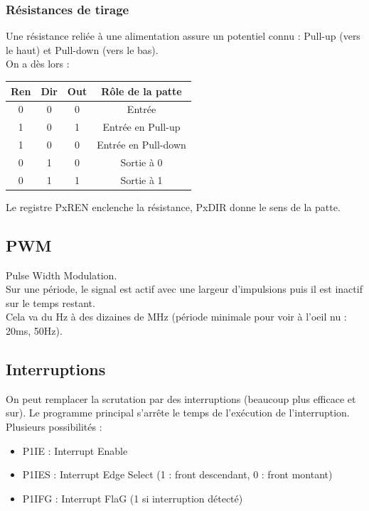 \documentclass[../main.tex]{subfiles}
\begin{document}
\subsubsection{Résistances de tirage}
Une résistance reliée à une alimentation assure un potentiel connu : Pull-up (vers le haut) et Pull-down (vers le bas).\\

On a dès lors : \begin{table}[hbt!]
    \centering
    \begin{tabular}{|c|c|c|c|}
    \hline
        Ren & Dir & Out & Rôle de la patte \\ \hline
        0 & 0 & 0 & Entrée\\ \hline
        1 & 0 & 1 & Entrée en Pull-up\\ \hline
        1 & 0 & 0 & Entrée en Pull-down\\ \hline
        0 & 1 & 0 & Sortie à 0\\ \hline
        0 & 1 & 1 & Sortie à 1\\ \hline
    \end{tabular}
\end{table}

Le registre PxREN enclenche la résistance, PxDIR donne le sens de la patte.\\

\subsection{PWM}
Pulse Width Modulation.\\
Sur une période, le signal est actif avec une largeur d'impulsions puis il est inactif sur le temps restant.\\

Cela va du Hz à des dizaines de MHz (période minimale pour voir à l'oeil nu : 20ms, 50Hz).\\

\subsection{Interruptions}
On peut remplacer la scrutation par des interruptions (beaucoup plus efficace et sur). Le programme principal s'arrête le temps de l'exécution de l'interruption. \\
Plusieurs possibilités : \begin{itemize}
    \item P1IE : Interrupt Enable\\
    \item P1IES : Interrupt Edge Select (1 : front descendant, 0 : front montant)\\
    \item P1IFG : Interrupt FlaG (1 si interruption détecté)\\
\end{itemize}
\end{document}
